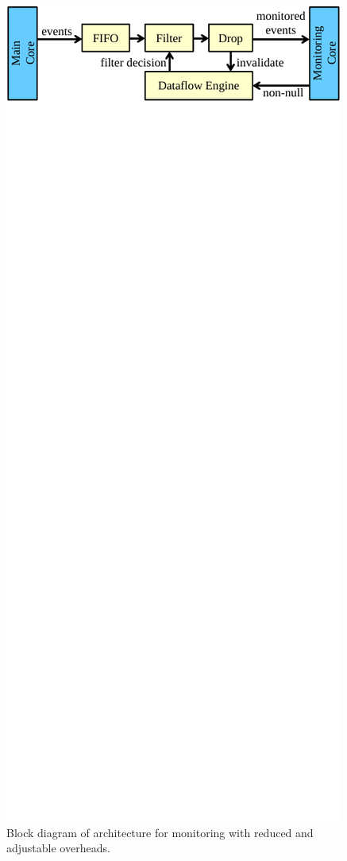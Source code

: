 \begin{figure}
  \begin{center}
    \includegraphics[width=\columnwidth]{figs/architecture_overview.pdf}
    \vspace{-0.2in}
    \caption{Block diagram of architecture for monitoring with reduced and adjustable overheads.}
    \label{fig:arch.overview}
    \vspace{-0.1in}
  \end{center}
\end{figure}

